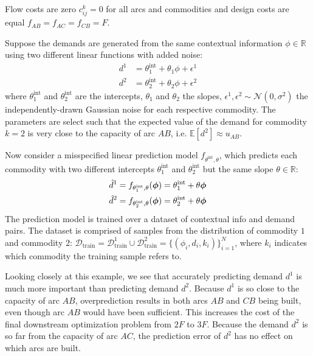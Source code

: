 Flow costs are zero $c_{ij}^k = 0$ for all arcs and commodities and design costs are equal $f_{AB} = f_{AC} = f_{CB} = F$. 

Suppose the demands are generated from the same contextual information $\phi \in  \mathbb{R}$ using two different linear functions with added noise:
\begin{equation}
\begin{aligned}
    d^1 &= \theta^\mathrm{int}_1 + \theta_1\phi + \epsilon^1\\
    d^2 &= \theta^\mathrm{int}_2 + \theta_2\phi + \epsilon^2
\end{aligned}
\end{equation}
where $\theta^\mathrm{int}_1$ and $\theta^\mathrm{int}_2$ are the intercepts, $\theta_1$ and $\theta_2$ the slopes, $\epsilon^1, \epsilon^2 \sim \mathcal{N}(0, \sigma^2)$ the independently-drawn Gaussian noise for each respective commodity. The parameters are select such that the expected value of the demand for commodity $k=2$ is very close to the capacity of arc $AB$, i.e. $\mathbb{E}[d^2] \approx u_{AB}$.

Now consider a misspecified linear prediction model $f_{\theta^\text{int},\theta}$, which predicts each commodity with two different intercepts $\theta^\mathrm{int}_1$ and $\theta^\mathrm{int}_2$ but the same slope $\theta \in \mathbb{R}$:
\begin{equation}
\begin{aligned}
    \hat{d}^1 &= f_{\theta^\mathrm{int}_1, \theta}({\bm{\phi}}) = \theta^\mathrm{int}_1 + \theta {\bm{\phi}}\\
    \hat{d}^2 &= f_{\theta^\mathrm{int}_2, \theta}({\bm{\phi}}) = \theta^\mathrm{int}_2 + \theta {\bm{\phi}}
\end{aligned}
\end{equation}
The prediction model is trained over a dataset of contextual info and demand pairs. The dataset is comprised of samples from the distribution of commodity $1$ and commodity $2$: $\mathcal{D}_\mathrm{train} = \mathcal{D}_\mathrm{train}^1 \cup \mathcal{D}_\mathrm{train}^2 = \{(\phi_i, d_i, k_i)\}_{i=1}^N$, where $k_i$ indicates which commodity the training sample refers to. 

Looking closely at this example, we see that accurately predicting demand $d^1$  is much more important than predicting demand $d^2$. Because $d^1$ is so close to the capacity of arc $AB$, overprediction results in both arcs $AB$ and $CB$ being built, even though arc $AB$ would have been sufficient. This increases the cost of the final downstream optimization problem from $2F$ to $3F$. Because the demand $d^2$ is so far from the capacity of arc $AC$, the prediction error of $d^2$ has no effect on which arcs are built.


